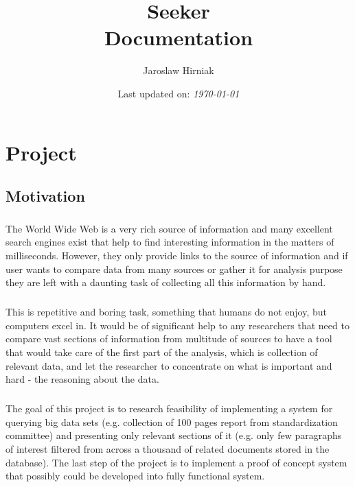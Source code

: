 \documentclass{tufte-book}
\title{\textbf{Seeker\\\normalsize{Documentation}}}
\author{Jaroslaw Hirniak}
\date{Last updated on: \emph{\today}}
\begin{document}
\maketitle

\tableofcontents

\chapter{Project}
 
\section{Motivation}
\paragraph{}
The World Wide Web is a very rich source of information and many excellent search engines exist that help to find interesting information in the matters of milliseconds. However, they only provide links to the source of information and if user wants to compare data from many sources or gather it for analysis purpose they are left with a daunting task of collecting all this information by hand.

\paragraph{}
This is repetitive and boring task, something that humans do not enjoy, but computers excel in. It would be of significant help to any researchers that need to compare vast sections of information from multitude of sources to have a tool that would take care of the first part of the analysis, which is collection of relevant data, and let the researcher to concentrate on what is important and hard - the reasoning about the data.

\paragraph{}
The goal of this project is to research feasibility of implementing a system for querying big data sets (e.g. collection of 100 pages report from standardization committee) and presenting only relevant sections of it (e.g. only few paragraphs of interest filtered from across a thousand of related documents stored in the database).  The last step of the project is to implement a proof of concept system that possibly could be developed into fully functional system.
\end{document}
